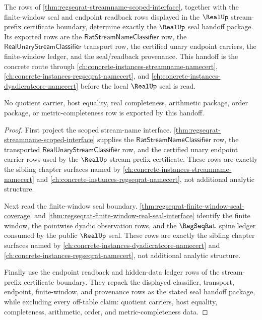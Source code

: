 \begin{theorem}
\label{thm:realup-regseqrat-streamname-seal-handoff}
The rows of \autoref{thm:regseqrat-streamname-scoped-interface}, together
with the finite-window seal and endpoint readback rows displayed in the
$\RealUp$ stream-prefix certificate boundary, determine exactly the $\RealUp$
seal handoff package. Its exported rows are the
$\mathsf{RatStreamNameClassifier}$ row, the
$\mathsf{RealUnaryStreamClassifier}$ transport row, the certified unary
endpoint carriers, the finite-window ledger, and the seal/readback provenance.
This handoff is the concrete route through
\autoref{ch:concrete-instances-streamname-namecert},
\autoref{ch:concrete-instances-regseqrat-namecert}, and
\autoref{ch:concrete-instances-dyadicratcore-namecert} before the local
$\RealUp$ seal is read.

No quotient carrier, host equality, real completeness, arithmetic package,
order package, or metric-completeness row is exported by this handoff.
\end{theorem}
\begin{proof}
First project the scoped stream-name interface.
\autoref{thm:regseqrat-streamname-scoped-interface}
supplies the $\mathsf{RatStreamNameClassifier}$ row, the transported
$\mathsf{RealUnaryStreamClassifier}$ row, and the certified unary endpoint
carrier rows used by the $\RealUp$ stream-prefix certificate. These rows are
exactly the sibling chapter surfaces named by
\autoref{ch:concrete-instances-streamname-namecert} and
\autoref{ch:concrete-instances-regseqrat-namecert}, not additional analytic
structure.

Next read the finite-window seal boundary.
\autoref{thm:regseqrat-finite-window-seal-coverage} and
\autoref{thm:regseqrat-finite-window-real-seal-interface} identify the finite
window, the pointwise dyadic observation rows, and the $\RegSeqRat$ spine
ledger consumed by the public $\RealUp$ seal. These rows are exactly the
sibling chapter surfaces named by
\autoref{ch:concrete-instances-dyadicratcore-namecert} and
\autoref{ch:concrete-instances-regseqrat-namecert}, not additional analytic
structure.

Finally use the endpoint readback and hidden-data ledger rows of the
stream-prefix certificate boundary. They repack the displayed classifier,
transport, endpoint, finite-window, and provenance rows as the stated seal
handoff package, while excluding every off-table claim: quotient carriers,
host equality, completeness, arithmetic, order, and metric-completeness data.
\end{proof}

